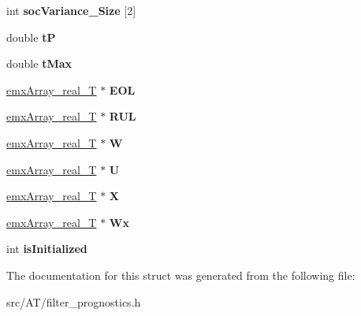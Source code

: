 \begin{DoxyCompactItemize}
\item 
\mbox{\label{structs__prognostics_a302ce07068d1f48d68d9fac193295d69}} 
int {\bfseries soc\+Variance\+\_\+\+Size} \mbox{[}2\mbox{]}
\item 
\mbox{\label{structs__prognostics_a74662ff4d291923424f5b5c59055ad39}} 
double {\bfseries tP}
\item 
\mbox{\label{structs__prognostics_a6dd75a8f15214d95a3dc4d6eee140a44}} 
double {\bfseries t\+Max}
\item 
\mbox{\label{structs__prognostics_ac44a71751a3edcafb3dfe2dd5947e0e5}} 
\hyperlink{structemxArray__real__T}{emx\+Array\+\_\+real\+\_\+T} $\ast$ {\bfseries E\+OL}
\item 
\mbox{\label{structs__prognostics_aa31f17659e9f16a42bb69592296d0657}} 
\hyperlink{structemxArray__real__T}{emx\+Array\+\_\+real\+\_\+T} $\ast$ {\bfseries R\+UL}
\item 
\mbox{\label{structs__prognostics_ab0603d981897a51d241a9650be5e1d12}} 
\hyperlink{structemxArray__real__T}{emx\+Array\+\_\+real\+\_\+T} $\ast$ {\bfseries W}
\item 
\mbox{\label{structs__prognostics_abfa9f9bbe2a1c7b6ee3e3a360cae5184}} 
\hyperlink{structemxArray__real__T}{emx\+Array\+\_\+real\+\_\+T} $\ast$ {\bfseries U}
\item 
\mbox{\label{structs__prognostics_a6541520d28cf7e72f782307142dd3ec0}} 
\hyperlink{structemxArray__real__T}{emx\+Array\+\_\+real\+\_\+T} $\ast$ {\bfseries X}
\item 
\mbox{\label{structs__prognostics_a896508fe727b7fd6fababf3121f9b59b}} 
\hyperlink{structemxArray__real__T}{emx\+Array\+\_\+real\+\_\+T} $\ast$ {\bfseries Wx}
\item 
\mbox{\label{structs__prognostics_a998411080842bf7a176be7990281adfc}} 
int {\bfseries is\+Initialized}
\end{DoxyCompactItemize}


The documentation for this struct was generated from the following file\+:\begin{DoxyCompactItemize}
\item 
src/\+A\+T/filter\+\_\+prognostics.\+h\end{DoxyCompactItemize}
